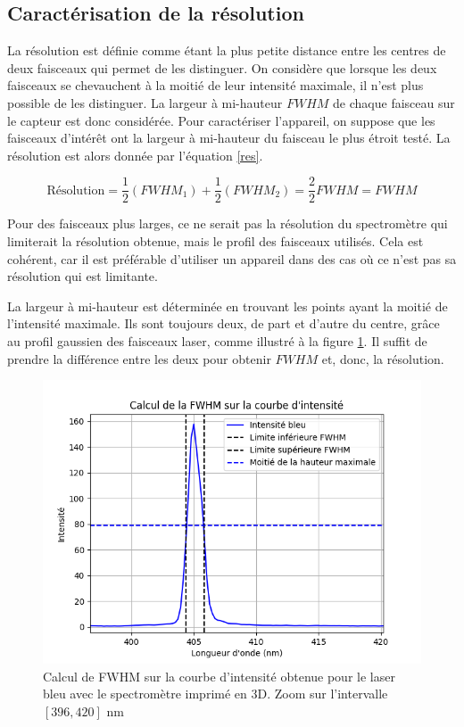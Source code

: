 \documentclass[11pt,letterpaper]{article}
\begin{document}

\subsection{Caractérisation de la résolution}

La résolution est définie comme étant la plus petite distance entre les centres de deux
faisceaux qui permet de les distinguer. On considère que lorsque les deux faisceaux se 
chevauchent à la moitié de leur intensité maximale, il n'est plus possible de les distinguer.
La largeur à mi-hauteur $FWHM$ de chaque faisceau sur le capteur est donc considérée. Pour 
caractériser l'appareil, on suppose que les faisceaux d'intérêt ont la largeur à mi-hauteur
du faisceau le plus étroit testé. La résolution est alors donnée par l'équation \ref{res}.

\begin{equation}\label{res}
  \text{Résolution} = \frac{1}{2}(FWHM_1)+\frac{1}{2}(FWHM_2)=\frac{2}{2}FWHM=FWHM
\end{equation}

Pour des faisceaux plus larges, ce ne serait pas la 
résolution du spectromètre qui limiterait la résolution obtenue, mais le profil des faisceaux
utilisés. Cela est cohérent, car il est préférable d'utiliser un appareil dans des cas où 
ce n'est pas sa résolution qui est limitante. 

La largeur à mi-hauteur est déterminée en trouvant les points ayant la moitié de l'intensité 
maximale. Ils sont toujours deux, de part et d'autre du centre, grâce au profil gaussien
des faisceaux laser, comme illustré à la figure \ref{FWHM_bleu}. Il suffit de prendre la 
différence entre les deux pour obtenir $FWHM$ et, donc, la résolution. 

\begin{figure}[h!]
  \centering
  \includegraphics[width=0.8\linewidth]{FWHM_bleu_3D.png}
  \caption{Calcul de FWHM sur la courbe d'intensité obtenue pour le laser bleu avec le spectromètre imprimé en 3D. Zoom sur l'intervalle $[396, 420]$ nm}
  \label{FWHM_bleu}
\end{figure}
\end{document}
